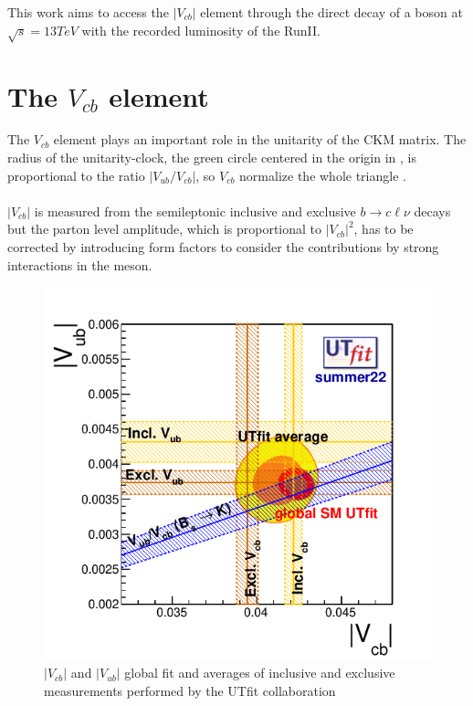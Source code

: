 \label{sec:vcb}
\vspace{-1cm}
\minitoc
This work aims to access the $|V_{cb}|$ element through the direct decay of a \PW boson at $\sqrt{s}=13 TeV$ with the recorded luminosity of the RunII.
\vspace{-0.25cm}
\section{The $V_{cb}$ element}\label{sec:vcb}
\begin{minipage}{\linewidth}
    \begin{minipage}{0.43\linewidth}
        The $V_{cb}$ element plays an important role in the unitarity of the CKM matrix. The radius of the unitarity-clock, the green circle centered in the origin in , is proportional to the ratio $|V_{ub}/V_{cb}|$, so $V_{cb}$ normalize the whole triangle \cite{Ricciardi2019DeterminationV_cb}.\\
        \\
        $|V_{cb}|$ is measured from the semileptonic inclusive and exclusive $b \to c\ell\nu$
        decays but the parton level amplitude, which is proportional to $|V_{cb}|^2$, has to be corrected by introducing form factors to consider the contributions by strong interactions in the meson. 
    \end{minipage}
    \hfill
    \begin{minipage}{0.55\linewidth}
        \vspace{-2.1cm}
        \begin{figure}[H]
            \centering
            \includegraphics[width=\linewidth]{fig//chap02-theory/vubvcb.png}
            \caption{$|V_{cb}|$ and $|V_{ub}|$ global fit and averages of inclusive and exclusive measurements performed by the UTfit collaboration \cite{Bona2023NewScheme}}
            \label{fig:vcbvub}
        \end{figure}
    \end{minipage}
\end{minipage}\\
